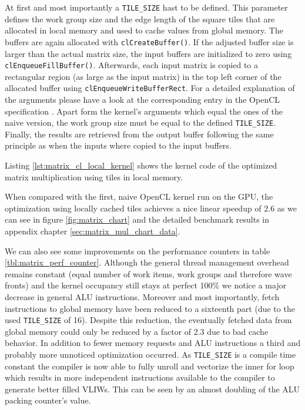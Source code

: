 At first and most importantly a \lstinline!TILE_SIZE! hast to be defined. This parameter defines the work group size and the edge length of the square tiles that are allocated in local memory and used to cache values from global memory.
The buffers are again allocated with \lstinline!clCreateBuffer()!. If the adjusted buffer size is larger than the actual matrix size, the input buffers are initialized to zero using \lstinline!clEnqueueFillBuffer()!. Afterwards, each input matrix is copied to a rectangular region (as large as the input matrix) in the top left corner of the allocated buffer using \lstinline!clEnqueueWriteBufferRect!. For a detailed explanation of the arguments please have a look at the corresponding entry in the OpenCL specification \cite[p.76]{opencl_spec}. Apart form the kernel's arguments which equal the ones of the naive version, the work group size must be equal to the defined \lstinline!TILE_SIZE!. Finally, the results are retrieved from the output buffer following the same principle as when the inputs where copied to the input buffers.

Listing \ref{lst:matrix_cl_local_kernel} shows the kernel code of the optimized matrix multiplication using tiles in local memory.



When compared with the first, naive OpenCL kernel run on the GPU, the optimization using locally cached tiles achieves a nice linear speedup of 2.6 as we can see in figure \ref{fig:matrix_chart} and the detailed benchmark results in appendix chapter \ref{sec:matrix_mul_chart_data}.

We can also see some improvements on the performance counters in table \ref{tbl:matrix_perf_counter}. Although the general thread management overhead remains constant (equal number of work items, work groups and therefore wave fronts) and the kernel occupancy still stays at perfect 100\% we notice a major decrease in general ALU instructions. Moreover and most importantly, fetch instructions to global memory have been reduced to a sixteenth part (due to the used \lstinline!TILE_SIZE! of 16). Despite this reduction, the eventually fetched data from global memory could only be reduced by a factor of 2.3 due to bad cache behavior.
In addition to fewer memory requests and ALU instructions a third and probably more unnoticed optimization occurred. As \lstinline!TILE_SIZE! is a compile time constant the compiler is now able to fully unroll and vectorize the inner for loop which results in more independent instructions available to the compiler to generate better filled VLIWs. This can be seen by an almost doubling of the ALU packing counter's value.



